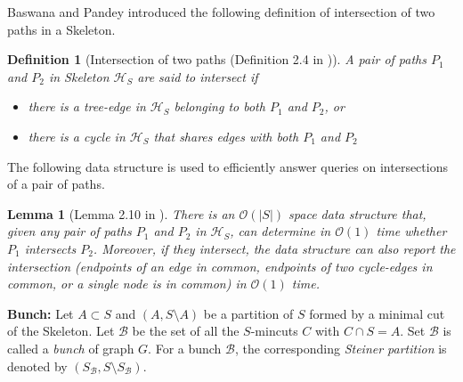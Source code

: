 \documentclass[letterpaper,11pt]{article}
\newtheorem{definition}{Definition}[]
\newtheorem{lemma}{Lemma}[]
\begin{document}
\noindent
Baswana and Pandey \cite{DBLP:conf/soda/BaswanaP22} introduced the following definition of intersection of two paths in a Skeleton.
\begin{definition} [Intersection of two paths (Definition 2.4 in \cite{DBLP:conf/soda/BaswanaP22})]
    A pair of paths $P_1$ and $P_2$ in Skeleton ${\mathcal H}_S$ are said to intersect if  
    \begin{itemize}
        \item there is a tree-edge in ${\mathcal H}_S$ belonging to both $P_1$ and $P_2$, or
        \item there is a cycle in ${\mathcal H}_S$ that shares edges with both $P_1$ and $P_2$
    \end{itemize}
\end{definition}
The following data structure is used to efficiently answer queries on intersections of a pair of paths. 
\begin{lemma} [Lemma 2.10 in \cite{DBLP:conf/soda/BaswanaP22}] \label{lem : lca queries on skeleton}
    There is an ${\mathcal O}(|S|)$ space data structure that, given any pair of paths $P_1$ and $P_2$ in ${\mathcal H}_S$, can determine in ${\mathcal O}(1)$ time whether $P_1$ intersects $P_2$. Moreover, if they intersect, the data structure can also report the intersection 
    (endpoints of an edge in common, endpoints of two cycle-edges in common, or a single node is in common)
in ${\mathcal O}(1)$ time.      
\end{lemma}






\noindent
\textbf{Bunch:} Let $A\subset S$ and $(A,S\setminus A)$ be a partition of $S$ formed by a minimal cut of the Skeleton.  Let ${\mathcal B}$ be the set of all the $S$-mincuts $C$ with $C\cap S=A$. Set ${\mathcal B}$ is called a \textit{bunch} of graph $G$.  For a bunch ${\mathcal B}$, the corresponding \textit{Steiner partition} is denoted by $(S_{\mathcal B},S\setminus S_{\mathcal B})$.\\
\end{document}
